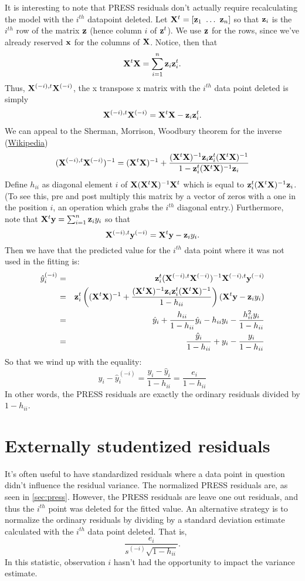 It is interesting to note that PRESS residuals don't actually require recalculating the
model with the $i^{th}$ datapoint deleted. Let $\mathbf{X}^t = [\mathbf{z}_1 ~ \ldots ~ \mathbf{z}_n]$
so that $\mathbf{z}_i$ is the $i^{th}$ row of the matrix $\mathbf{z}$ (hence column $i$ of $\mathbf{z}^t$). 
We use $\mathbf{z}$ for the rows, since we've already reserved $\mathbf{x}$ for the columns of $\mathbf{X}$. 
Notice, then that 
$$
\mathbf{X}^t \mathbf{X} = \sum_{i=1}^n \mathbf{z}_i \mathbf{z}_i^t.
$$
Thus, $\mathbf{X}^{(-i), t} \mathbf{X}^{(-i)}$, the x transpose x matrix with the $i^{th}$ data
point deleted is simply
$$
\mathbf{X}^{(-i), t} \mathbf{X}^{(-i)} = \mathbf{X}^t \mathbf{X} - \mathbf{z}_i \mathbf{z}_i^t.
$$
We can appeal to the Sherman, Morrison, Woodbury theorem for the inverse
(\href{https://en.wikipedia.org/wiki/Sherman%E2%80%93Morrison_formula}{Wikipedia})
$$
(\mathbf{X}^{(-i), t} \mathbf{X}^{(-i)})^{-1}
= (\mathbf{X}^t \mathbf{X})^{-1} + \frac{(\mathbf{X}^t \mathbf{X})^{-1} \mathbf{z}_i \mathbf{z}_i^t (\mathbf{X}^t \mathbf{X})^{-1}}{1 - \mathbf{z}_i^t (\mathbf{X}^t \mathbf{X})^{-1} \mathbf{z}_i}
$$
Define $h_{ii}$ as diagonal element $i$ of $\mathbf{X} (\mathbf{X}^t \mathbf{X})^{-1} \mathbf{X}^t$ which is equal to
$\mathbf{z}_i^t (\mathbf{X}^t \mathbf{X})^{-1} \mathbf{z}_i$. (To see this, pre and post multiply this matrix by a 
vector of zeros with a one in the position $i$, an operation which grabs the $i^{th}$ diagonal entry.)
Furthermore, note that $\mathbf{X}^t \mathbf{y} = \sum_{i=1}^n \mathbf{z}_i y_i$ so that
$$
\mathbf{X}^{(-i),t} \mathbf{y}^{(-i)} = \mathbf{X}^t \mathbf{y} - \mathbf{z}_i y_i.
$$
Then we have that the predicted value for the $i^{th}$ data point where it was not used in the fitting is:
\begin{eqnarray*}
\hat y^{(-i)}_i & = & \mathbf{z}_i^t (\mathbf{X}^{(-i), t} \mathbf{X}^{(-i)})^{-1} \mathbf{X}^{(-i),t} \mathbf{y}^{(-i)}\\
& = & \mathbf{z}_i^t \left((\mathbf{X}^t \mathbf{X})^{-1} + \frac{(\mathbf{X}^t \mathbf{X})^{-1} \mathbf{z}_i \mathbf{z}_i^t (\mathbf{X}^t \mathbf{X})^{-1}}{1 - h_{ii}} \right)(\mathbf{X}^t \mathbf{y} - \mathbf{z}_i y_i) \\
& = & \hat y_i + \frac{h_{ii}}{1 - h_{ii}} \hat y_i - h_{ii} y_i - \frac{h_{ii}^2 y_i}{1 - h_{ii}} \\
& = & \frac{\hat y_i}{1 - h_{ii}} + y_i - \frac{y_i}{1 - h_{ii}}
\end{eqnarray*}
So that we wind up with the equality: 
$$
y_i - \hat y^{(-i)}_i = \frac{y_i - \hat y_i}{1 - h_{ii}} = \frac{e_i}{1 - h_{ii}}
$$
In other words, the PRESS residuals are exactly the ordinary residuals divided by $1 - h_{ii}$. 

\section{Externally studentized residuals}
It's often useful to have standardized residuals where a data point in question didn't
influence the residual variance. The normalized
PRESS residuals are, as seen in \ref{sec:press}.  However, the PRESS residuals are 
leave one out residuals, and thus the $i^{th}$ point was deleted for the fitted value. An alternative
strategy is to normalize the ordinary residuals by dividing by a standard deviation estimate
calculated with the $i^{th}$ data point deleted. That is,
$$
\frac{e_i}{s^{(-i)}\sqrt{1 - h_{ii}}}.
$$
In this statistic, observation $i$ hasn't had the opportunity to impact the variance estimate.

